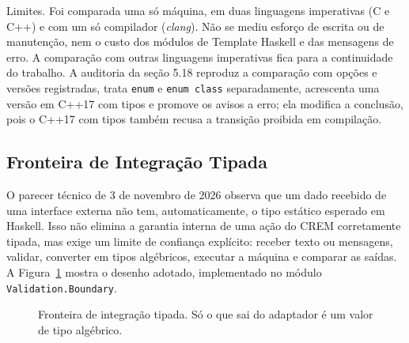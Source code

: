 \documentclass[12pt,a4paper]{article}
\begin{document}
Limites. Foi comparada uma só máquina, em duas linguagens imperativas (C e C++) e com um só compilador (\textit{clang}). Não se mediu esforço de escrita ou de manutenção, nem o custo dos módulos de Template Haskell e das mensagens de erro. A comparação com outras linguagens imperativas fica para a continuidade do trabalho. A auditoria da seção 5.18 reproduz a comparação com opções e versões registradas, trata \texttt{enum} e \texttt{enum class} separadamente, acrescenta uma versão em C++17 com tipos e promove os avisos a erro; ela modifica a conclusão, pois o C++17 com tipos também recusa a transição proibida em compilação.

\subsection{Fronteira de Integração Tipada}

O parecer técnico de 3 de novembro de 2026 observa que um dado recebido de uma interface externa não tem, automaticamente, o tipo estático esperado em Haskell. Isso não elimina a garantia interna de uma ação do CREM corretamente tipada, mas exige um limite de confiança explícito: receber texto ou mensagens, validar, converter em tipos algébricos, executar a máquina e comparar as saídas. A Figura~\ref{fig:fronteira} mostra o desenho adotado, implementado no módulo \texttt{Validation.Boundary}.

\begin{figure}[h]
\centering
\footnotesize
{}
\caption{Fronteira de integração tipada. Só o que sai do adaptador é um valor de tipo algébrico.}
\label{fig:fronteira}
\end{figure}
\end{document}
